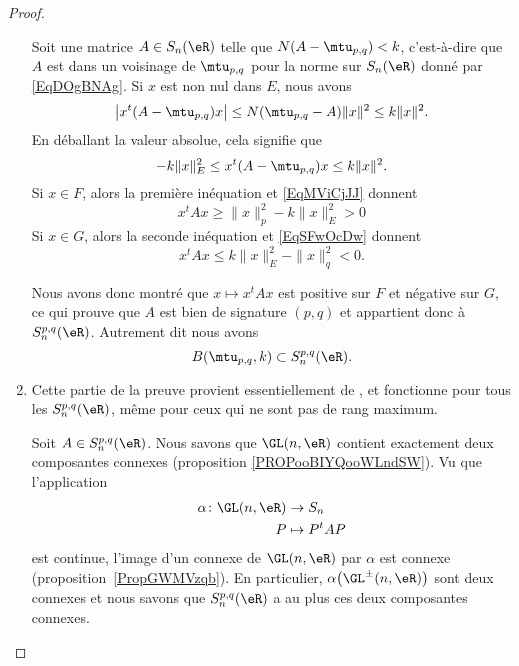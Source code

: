 \begin{proof}
\begin{enumerate}
		      Soit une matrice \( A\in S_n(\eR)\) telle que \( N(A-\mtu_{p,q})<k\), c'est-à-dire que \( A\) est dans un voisinage de \( \mtu_{p,q}\) pour la norme sur \( S_n(\eR)\) donné par \eqref{EqDOgBNAg}. Si \( x\) est non nul dans \( E\), nous avons
		      \begin{equation}
			      \big| x^t(A-\mtu_{p,q})x \big|\leq N(\mtu_{p,q}-A)\| x \|^2\leq k\| x \|^2.
		      \end{equation}
		      En déballant la valeur absolue, cela signifie que
		      \begin{equation}
			      -k\| x \|_E^2\leq x^t(A-\mtu_{p,q})x\leq k\| x \|^2.
		      \end{equation}
		      Si \( x\in F\), alors la première inéquation et \eqref{EqMViCjJJ} donnent
		      \begin{equation}
			      x^tAx\geq \| x \|_p^2-k\| x \|_E^2>0
		      \end{equation}
		      Si \( x\in G\), alors la seconde inéquation et \eqref{EqSFwOcDw} donnent
		      \begin{equation}
			      x^tAx\leq  k\| x \|_E^2-\| x \|_q^2<0.
		      \end{equation}

		      Nous avons donc montré que \( x\mapsto x^tAx\) est positive sur \( F\) et négative sur \( G\), ce qui prouve que \( A\) est bien de signature \( (p,q)\) et appartient donc à \( S_n^{p,q}(\eR)\). Autrement dit nous avons
		      \begin{equation}
			      B(\mtu_{p,q},k)\subset S_n^{p,q}(\eR).
		      \end{equation}

		\item
		      Cette partie de la preuve provient essentiellement de \cite{VKqpMYL}, et fonctionne pour tous les \( S_n^{p,q}(\eR)\), même pour ceux qui ne sont pas de rang maximum.

		      Soit \( A\in S_n^{p,q}(\eR)\). Nous savons que \( \GL(n,\eR)\) contient exactement deux composantes connexes (proposition \ref{PROPooBIYQooWLndSW}). Vu que l'application
		      \begin{equation}
			      \begin{aligned}
				      \alpha\colon \GL(n,\eR) & \to S_n       \\
				      P                       & \mapsto P^tAP
			      \end{aligned}
		      \end{equation}
		      est continue, l'image d'un connexe de \( \GL(n,\eR)\) par \( \alpha\) est connexe (proposition~\ref{PropGWMVzqb}). En particulier, \( \alpha\big( \GL^{\pm}(n,\eR) \big)\) sont deux connexes et nous savons que \( S_n^{p,q}(\eR)\) a au plus ces deux composantes connexes.


\end{enumerate}
\end{proof}
